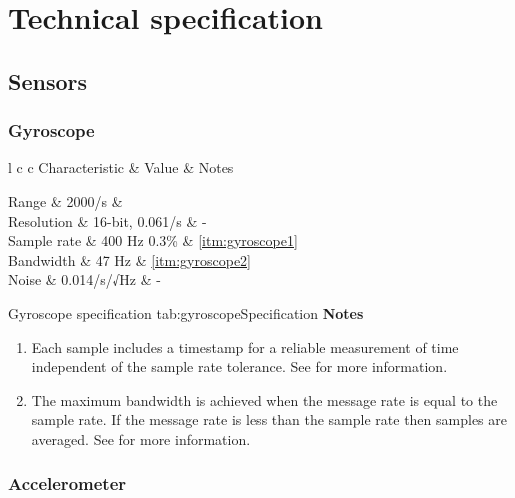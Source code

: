 \section{Technical specification}

\subsection{Sensors}

\newcommand{\sensorTable}[4]{
    \customTable
    {l c c}
    {Characteristic & Value & Notes}
    {
        #1
    }
    {#2}
    {#3}
    \textbf{Notes}
    \begin{enumerate}[nolistsep]
        #4
    \end{enumerate}
}

\newcommand{\noteSampleRate}{Each sample includes a timestamp for a reliable measurement of time independent of the sample rate tolerance.  See \Fref{sec:messageRates} for more information.}

\newcommand{\noteBandwidth}{The maximum bandwidth is achieved when the message rate is equal to the sample rate.  If the message rate is less than the sample rate then samples are averaged.  See \Fref{sec:messageRates} for more information.}

\newcommand{\noteAccuracy}[3]{The accuracy at 1 #1 is evaluated as the deviation of the measured magnitude of #2 for a 360\textdegree{} rotation around the X, Y, and Z axis aligned to the #3 axis.}

\subsubsection{Gyroscope}

\sensorTable
{
    Range & \textpm{}2000\textdegree{}/s & \\
    Resolution & 16-bit, 0.061\textdegree{}/s & -\\
    Sample rate & 400 Hz \textpm{}0.3\% & \ref{itm:gyroscope1}\\
    Bandwidth & 47 Hz & \ref{itm:gyroscope2}\\
    Noise & 0.014\textdegree{}/s/√Hz & -\\
}
{Gyroscope specification}
{tab:gyroscopeSpecification}
{
    \item \label{itm:gyroscope1} \noteSampleRate
    \item \label{itm:gyroscope2} \noteBandwidth
}

\subsubsection{Accelerometer}

